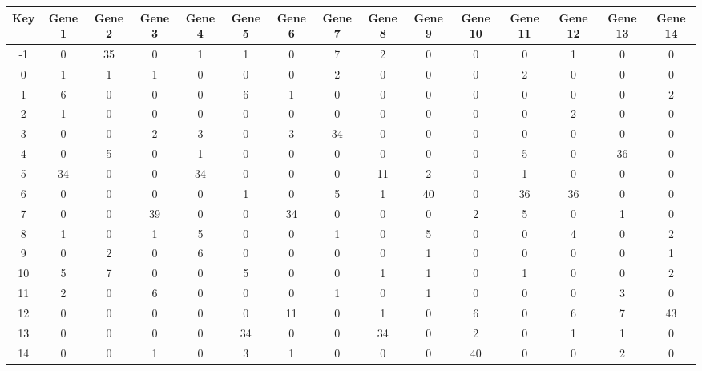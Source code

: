 \begin{tabular}{|c|c|c|c|c|c|c|c|c|c|c|c|c|c|c|}
\hline
Key & Gene 1 & Gene 2 & Gene 3 & Gene 4 & Gene 5 & Gene 6 & Gene 7 & Gene 8 & Gene 9 & Gene 10 & Gene 11 & Gene 12 & Gene 13 & Gene 14 \\
\hline
-1 & 0 & 35 & 0 & 1 & 1 & 0 & 7 & 2 & 0 & 0 & 0 & 1 & 0 & 0 \\
0 & 1 & 1 & 1 & 0 & 0 & 0 & 2 & 0 & 0 & 0 & 2 & 0 & 0 & 0 \\
1 & 6 & 0 & 0 & 0 & 6 & 1 & 0 & 0 & 0 & 0 & 0 & 0 & 0 & 2 \\
2 & 1 & 0 & 0 & 0 & 0 & 0 & 0 & 0 & 0 & 0 & 0 & 2 & 0 & 0 \\
3 & 0 & 0 & 2 & 3 & 0 & 3 & 34 & 0 & 0 & 0 & 0 & 0 & 0 & 0 \\
4 & 0 & 5 & 0 & 1 & 0 & 0 & 0 & 0 & 0 & 0 & 5 & 0 & 36 & 0 \\
5 & 34 & 0 & 0 & 34 & 0 & 0 & 0 & 11 & 2 & 0 & 1 & 0 & 0 & 0 \\
6 & 0 & 0 & 0 & 0 & 1 & 0 & 5 & 1 & 40 & 0 & 36 & 36 & 0 & 0 \\
7 & 0 & 0 & 39 & 0 & 0 & 34 & 0 & 0 & 0 & 2 & 5 & 0 & 1 & 0 \\
8 & 1 & 0 & 1 & 5 & 0 & 0 & 1 & 0 & 5 & 0 & 0 & 4 & 0 & 2 \\
9 & 0 & 2 & 0 & 6 & 0 & 0 & 0 & 0 & 1 & 0 & 0 & 0 & 0 & 1 \\
10 & 5 & 7 & 0 & 0 & 5 & 0 & 0 & 1 & 1 & 0 & 1 & 0 & 0 & 2 \\
11 & 2 & 0 & 6 & 0 & 0 & 0 & 1 & 0 & 1 & 0 & 0 & 0 & 3 & 0 \\
12 & 0 & 0 & 0 & 0 & 0 & 11 & 0 & 1 & 0 & 6 & 0 & 6 & 7 & 43 \\
13 & 0 & 0 & 0 & 0 & 34 & 0 & 0 & 34 & 0 & 2 & 0 & 1 & 1 & 0 \\
14 & 0 & 0 & 1 & 0 & 3 & 1 & 0 & 0 & 0 & 40 & 0 & 0 & 2 & 0 \\
\hline
\end{tabular}